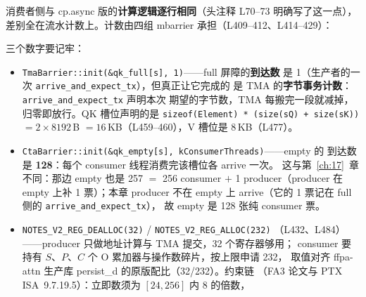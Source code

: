 

消费者侧与 cp.async 版的\textbf{计算逻辑逐行相同}（头注释 L70--73 明确写了这一点），
差别全在流水计数上。计数由四组 mbarrier 承担（L409--412、L414--429）：



三个数字要记牢：

\begin{itemize}[itemsep=2pt,topsep=2pt]
  \item \texttt{Tma\allowbreak{}Barrier::\allowbreak{}init\allowbreak{}(\&qk\_\allowbreak{}full[s],\allowbreak{} 1)}——full 屏障的\textbf{到达数}
        是 1（生产者的一次 \texttt{arrive\_\allowbreak{}and\_\allowbreak{}expect\_\allowbreak{}tx}），但真正让它完成的
        是 TMA 的\textbf{字节事务计数}：\texttt{arrive\_\allowbreak{}and\_\allowbreak{}expect\_\allowbreak{}tx} 声明本次
        期望的字节数，TMA 每搬完一段就减掉，归零即放行。QK 槽位声明的是
        \texttt{sizeof\allowbreak{}(Element) * \allowbreak{}(size\allowbreak{}(s\allowbreak{}Q) + size\allowbreak{}(s\allowbreak{}K))} $= 2 \times 8192$\,B
        $= 16$\,KB（L459--460），V 槽位是 8\,KB（L477）。
  \item \texttt{Cta\allowbreak{}Barrier::\allowbreak{}init\allowbreak{}(\&qk\_\allowbreak{}empty[s],\allowbreak{} k\allowbreak{}Consumer\allowbreak{}Threads)}——empty 的
        到达数是 \textbf{128}：每个 consumer 线程消费完该槽位各 arrive 一次。
        这与第~\ref{ch:17}~章不同：那边 empty 也是 257 $=$ 256 consumer $+$
        1 producer（producer 在 empty 上补 1 票）；本章 producer 不在 empty
        上 arrive（它的 1 票记在 full 侧的 \texttt{arrive\_and\_expect\_tx}），
        故 empty 是 128 张纯 consumer 票。
  \item \texttt{NOTES\_\allowbreak{}V2\_\allowbreak{}REG\_\allowbreak{}DEALLOC\allowbreak{}(32)} / \texttt{NOTES\_\allowbreak{}V2\_\allowbreak{}REG\_\allowbreak{}ALLOC\allowbreak{}(232)}
        （L432、L484）——producer 只做地址计算与 TMA 提交，32 个寄存器够用；
        consumer 要持有 $S$、$P$、$C$ 个 O 累加器与操作数碎片，按上限申请 232，
        取值对齐 ffpa-attn 生产库 persist\_d 的原版配比（32/232）。约束链
        （FA3 论文与 PTX ISA~9.7.19.5）：立即数须为 $[24,256]$ 内 8 的倍数，

\end{itemize}
